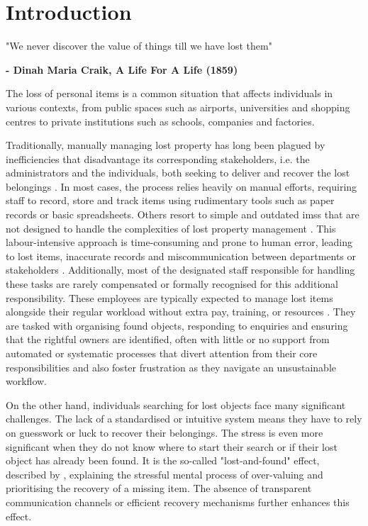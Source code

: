 \chapter{Introduction}
\label{chapter:introduction}

\begin{introduction}
"We never discover the value of things till we have lost them"

\textbf{- Dinah Maria Craik, A Life For A Life (1859)}
\end{introduction}

The loss of personal items is a common situation that affects individuals in various contexts, from public spaces such as airports, universities and shopping centres \cites{Oke2017, Yao2019} to private institutions such as schools, companies and factories.

Traditionally, manually managing lost property has long been plagued by inefficiencies that disadvantage its corresponding stakeholders, i.e. the administrators and the individuals, both seeking to deliver and recover the lost belongings \cite{Sinha2024}. In most cases, the process relies heavily on manual efforts, requiring staff to record, store and track items using rudimentary tools such as paper records or basic spreadsheets. Others resort to simple and outdated \acp{ims} that are not designed to handle the complexities of lost property management \cite{Guinard2008}. This labour-intensive approach is time-consuming and prone to human error, leading to lost items, inaccurate records and miscommunication between departments or stakeholders \cite{Sinha2024, Guinard2008}. Additionally, most of the designated staff responsible for handling these tasks are rarely compensated or formally recognised for this additional responsibility. These employees are typically expected to manage lost items alongside their regular workload without extra pay, training, or resources \cite{Guinard2008}. They are tasked with organising found objects, responding to enquiries and ensuring that the rightful owners are identified, often with little or no support from automated or systematic processes that divert attention from their core responsibilities and also foster frustration as they navigate an unsustainable workflow.

On the other hand, individuals searching for lost objects face many significant challenges. The lack of a standardised or intuitive system means they have to rely on guesswork or luck to recover their belongings. The stress is even more significant when they do not know where to start their search or if their lost object has already been found. It is the so-called "lost-and-found" effect, described by , explaining the stressful mental process of over-valuing and prioritising the recovery of a missing item. The absence of transparent communication channels \cite{Guinard2008} or efficient recovery mechanisms further enhances this effect.

